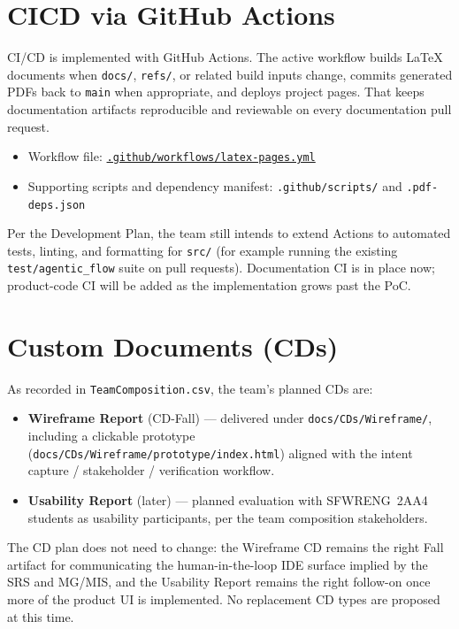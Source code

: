 \documentclass{article}
\begin{document}
\section{CICD via GitHub Actions}

CI/CD is implemented with GitHub Actions. The active workflow builds LaTeX
documents when \texttt{docs/}, \texttt{refs/}, or related build inputs change,
commits generated PDFs back to \texttt{main} when appropriate, and deploys
project pages. That keeps documentation artifacts reproducible and reviewable
on every documentation pull request.

\begin{itemize}
  \item Workflow file:
    \href{https://github.com/RishabShine/IDE3.0/blob/main/.github/workflows/latex-pages.yml}{\texttt{.github/workflows/latex-pages.yml}}
  \item Supporting scripts and dependency manifest:
    \texttt{.github/scripts/} and \texttt{.pdf-deps.json}
\end{itemize}

Per the Development Plan, the team still intends to extend Actions to automated
tests, linting, and formatting for \texttt{src/} (for example running the
existing \texttt{test/agentic\_flow} suite on pull requests). Documentation CI
is in place now; product-code CI will be added as the implementation grows past
the PoC.

\section{Custom Documents (CDs)}

As recorded in \texttt{TeamComposition.csv}, the team's planned CDs are:

\begin{itemize}
  \item \textbf{Wireframe Report} (CD-Fall) --- delivered under
    \texttt{docs/CDs/Wireframe/}, including a clickable prototype
    (\texttt{docs/CDs/Wireframe/prototype/index.html}) aligned with the intent
    capture / stakeholder / verification workflow.
  \item \textbf{Usability Report} (later) --- planned evaluation with
    SFWRENG~2AA4 students as usability participants, per the team composition
    stakeholders.
\end{itemize}

The CD plan does not need to change: the Wireframe CD remains the right Fall
artifact for communicating the human-in-the-loop IDE surface implied by the
SRS and MG/MIS, and the Usability Report remains the right follow-on once more
of the product UI is implemented. No replacement CD types are proposed at this
time.
\end{document}
